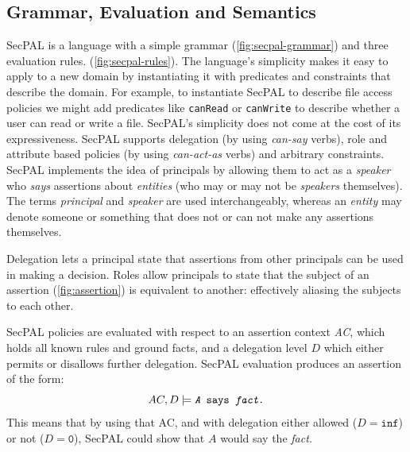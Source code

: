 \documentclass[thesis.tex]{subfiles}
\begin{document}
\subsection{Grammar, Evaluation and Semantics}
\label{ssec:grammar-evaluation-semantics}

SecPAL is a language with a simple grammar
(\autoref{fig:secpal-grammar}) and three evaluation
rules. (\autoref{fig:secpal-rules}). The language's simplicity makes
it easy to apply to a new domain by instantiating it with predicates
and constraints that describe the domain. For example, to instantiate
SecPAL to describe file access policies we might add predicates like
\texttt{canRead} or \texttt{canWrite} to describe whether a user can
read or write a file. SecPAL's simplicity does not come at the cost of
its expressiveness. SecPAL supports delegation (by using
\emph{can-say} verbs), role and attribute based policies (by using
\emph{can-act-as} verbs) and arbitrary constraints.
SecPAL implements the idea of principals by allowing them to act as a \emph{speaker} who \emph{says} assertions about \emph{entities} (who may or may not be \emph{speakers} themselves). The terms \emph{principal} and \emph{speaker} are used interchangeably, whereas an \emph{entity} may denote someone or something that does not or can not make any assertions themselves.

Delegation lets a
principal state that assertions from other principals can be used in
making a decision. Roles allow principals to state that the subject
of an assertion (\autoref{fig:assertion}) is equivalent to another: effectively aliasing the
subjects to each other.


SecPAL policies are evaluated with respect to an assertion context
\emph{AC}, which holds all known rules and ground facts, and a
delegation level $D$ which either permits or disallows further
delegation. SecPAL evaluation produces an assertion of the form:
\begin{equation*}
 AC, D \models \texttt{{\itshape A} says {\itshape fact}.} 
\end{equation*}
This means that by using that AC, and with delegation either
allowed ($D = \mathtt{inf}$) or not ($D = \mathtt{0}$), SecPAL could show that
$A$ would say the \emph{fact.}
\end{document}
